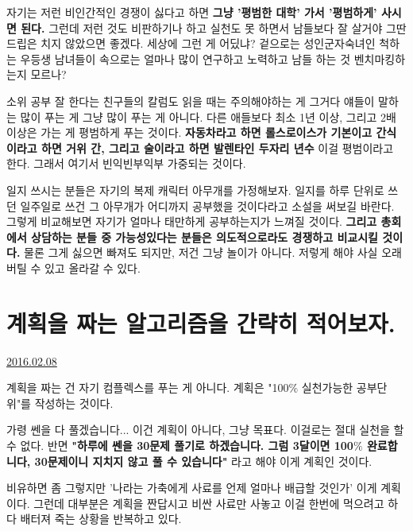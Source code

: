 자기는 저런 비인간적인 경쟁이 싫다고 하면 \textbf{그냥 '평범한 대학' 가서 '평범하게' 사시면 된다.}
그런데 저런 것도 비판하기나 하고 실천도 못 하면서 남들보다 잘 살거야 그딴 드립은 치지 않았으면 좋겠다. 세상에 그런 게 어딨냐?
겉으로는 성인군자숙녀인 척하는 우등생 남녀들이 속으로는 얼마나 많이 연구하고 노력하고 남들 하는 것 벤치마킹하는지 모르나?
\vspace{5mm}

소위 공부 잘 한다는 친구들의 칼럼도 읽을 때는 주의해야하는 게 그거다
얘들이 말하는 많이 푸는 게 그냥 많이 푸는 게 아니다. 다른 애들보다 최소 1년 이상, 그리고 2배 이상은 가는 게 평범하게 푸는 것이다.
\textbf{자동차라고 하면 롤스로이스가 기본이고 간식이라고 하면 거위 간, 그리고 술이라고 하면 발렌타인 두자리 년수}
이걸 평범이라고 한다. 그래서 여기서 빈익빈부익부 가중되는 것이다.
\vspace{5mm}

일지 쓰시는 분들은 자기의 복제 캐릭터 아무개를 가정해보자.
일지를 하루 단위로 쓰던 일주일로 쓰건 그 아무개가 어디까지 공부했을 것이다라고 소설을 써보길 바란다.
그렇게 비교해보면 자기가 얼마나 태만하게 공부하는지가 느껴질 것이다.
\textbf{그리고 총회에서 상담하는 분들 중 가능성있다는 분들은 의도적으로라도 경쟁하고 비교시킬 것이다.}
물론 그게 싫으면 빠져도 되지만, 저건 그냥 놀이가 아니다. 저렇게 해야 사실 오래 버틸 수 있고 올라갈 수 있다.
\vspace{5mm}










\section{계획을 짜는 알고리즘을 간략히 적어보자.}
\href{https://www.kockoc.com/Apoc/628832}{2016.02.08}

\vspace{5mm}

계획을 짜는 건 자기 컴플렉스를 푸는 게 아니다.
계획은 "100$\%$ 실천가능한 공부단위"를 작성하는 것이다.
\vspace{5mm}

가령 쎈을 다 풀겠습니다... 이건 계획이 아니다, 그냥 목표다. 이걸로는 절대 실천을 할 수 없다.
반면 \textbf{"하루에 쎈을 30문제 풀기로 하겠습니다. 그럼 3달이면 100$\%$ 완료합니다, 30문제이니 지치지 않고 풀 수 있습니다"}
라고 해야 이게 계획인 것이다.
\vspace{5mm}

비유하면 좀 그렇지만 '나라는 가축에게 사료를 언제 얼마나 배급할 것인가'
이게 계획이다. 그런데 대부분은 계획을 짠답시고 비싼 사료만 사놓고 이걸 한번에 먹으려고 하다 배터져 죽는 상황을 반복하고 있다.
\vspace{5mm}

